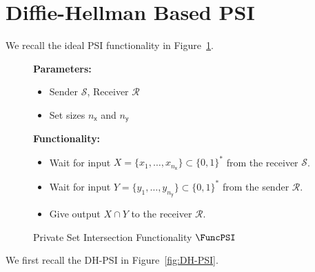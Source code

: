 \section{Diffie-Hellman Based PSI}
We recall the ideal PSI functionality in Figure~\ref{fig:fpsi}. 
\begin{figure}[!hbtp]
\begin{framed}
\begin{minipage}[center]{\textwidth}
\begin{trivlist}
\item \textbf{Parameters:} 
\begin{itemize}
\item Sender $\mathcal{S}$, Receiver $\mathcal{R}$
\item Set sizes $n_\mathsf{x}$ and $n_\mathsf{y}$
\end{itemize}

\item \textbf{Functionality:}
\begin{itemize}
\item Wait for input $X=\{x_1,\dots,x_{n_\mathsf{x}}\}\subset \{0,1\}^*$ from the receiver $\mathcal{S}$.
\item Wait for input $Y=\{y_1,\dots,y_{n_\mathsf{y}}\}\subset \{0,1\}^*$ from the sender $\mathcal{R}$.
\item Give output $X \cap Y$ to the receiver $\mathcal{R}$.
\end{itemize}
\end{trivlist}
\end{minipage}
\end{framed}
\caption{Private Set Intersection Functionality $\FuncPSI$}\label{fig:fpsi}
\end{figure}

We first recall the DH-PSI in Figure~\ref{fig:DH-PSI}. 

